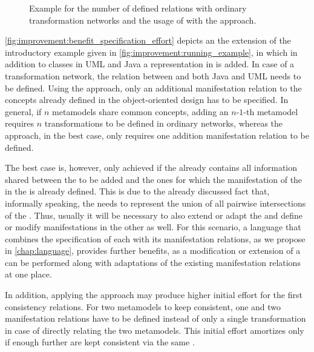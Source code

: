 \begin{figure}
    \centering
    
    \caption[Benefit of \commonalities regarding specification effort]{Example for the number of defined relations with ordinary transformation networks and the usage of \conceptmetamodels with the \commonalities approach.} %
    \label{fig:improvement:benefit_specification_effort}
\end{figure}

\autoref{fig:improvement:benefit_specification_effort} depicts an the extension of the introductory example given in \autoref{fig:improvement:running_example}, in which in addition to classes in \gls{UML} and Java a representation in \cplusplus is added.
In case of a transformation network, the relation between \cplusplus and both Java and \gls{UML} needs to be defined.
Using the \commonalities approach, only an additional manifestation relation to the concepts already defined in the object-oriented design \conceptmetamodels has to be specified.
In general, if $n$ metamodels share common concepts, adding an $n$-$1$-th metamodel requires $n$ transformations to be defined in ordinary networks, whereas the \commonalities approach, in the best case, only requires one addition manifestation relation to be defined.

The best case is, however, only achieved if the \conceptmetamodel already contains all information shared between the \concretemetamodel to be added and the ones for which the manifestation of the \commonalities in the \conceptmetamodel is already defined.
This is due to the already discussed fact that, informally speaking, the \conceptmetamodel needs to represent the union of all pairwise intersections of the \concretemetamodels.
Thus, usually it will be necessary to also extend or adapt the \conceptmetamodel and define or modify manifestations in the other \concretemetamodels as well.
For this scenario, a language that combines the specification of each \commonality with its manifestation relations, as we propose in \autoref{chap:language}, provides further benefits, as a modification or extension of a \commonality can be performed along with adaptations of the existing manifestation relations at one place.

In addition, applying the \commonalities approach may produce higher initial effort for the first consistency relations.
For two metamodels to keep consistent, one \conceptmetamodel and two manifestation relations have to be defined instead of only a single transformation in case of directly relating the two metamodels.
This initial effort amortizes only if enough further \concretemetamodels are kept consistent via the same \conceptmetamodel.

